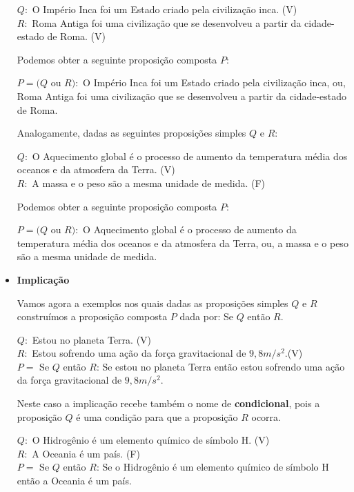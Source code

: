 \begin{itemize}
\begin{exem}
 $Q:$ O Império Inca foi um Estado criado pela civilização inca. (V) \\
 $R:$ Roma Antiga foi uma civilização que se desenvolveu a partir da cidade-estado de Roma. (V)

 Podemos obter a seguinte proposição composta $P$:

 $P= (Q$ ou $R):$ O Império Inca foi um Estado criado pela civilização inca, ou, Roma Antiga foi uma civilização que se desenvolveu a partir da cidade-estado de Roma.
 \end{exem}

 \begin{exem} \label{(Ou 3)}
 Analogamente, dadas as seguintes proposições simples $Q$ e $R$:

 $Q:$ O Aquecimento global é o processo de aumento da temperatura média dos oceanos e da atmosfera da Terra. (V) \\
 $R:$ A massa e o peso são a mesma unidade de medida. (F)

 Podemos obter a seguinte proposição composta $P$:

 $P= (Q$ ou $R):$ O Aquecimento global é o processo de aumento da temperatura média dos oceanos e da atmosfera da Terra, ou, a massa e o peso são a mesma unidade de medida.
 \end{exem}


 \item \textbf{Implicação}

 Vamos agora a exemplos nos quais dadas as proposições simples $Q$ e $R$ construímos a proposição composta $P$ dada por: Se $Q$ então $R$.

  \begin{exem} \label{(Se 1)}
 $Q:$ Estou no planeta Terra. (V) \\
 $R:$ Estou sofrendo uma ação da força gravitacional de $9,8 m/s^2$.(V) \\
 $P=$ Se $Q$ então $R$: Se estou no planeta Terra então estou sofrendo uma ação da força gravitacional de $9,8 m/s^2$.

 Neste caso a implicação recebe também o nome de \textbf{condicional}, pois a proposição $Q$ é uma condição para que a proposição $R$ ocorra.\end{exem}

 \begin{exem} \label{(Se 2)}
 $Q:$ O Hidrogênio é um elemento químico de símbolo H. (V) \\
 $R:$ A Oceania é um país. (F) \\
 $P=$ Se $Q$ então $R$: Se o Hidrogênio é um elemento químico de símbolo H então a Oceania é um país.
 \end{exem}


\end{itemize}

